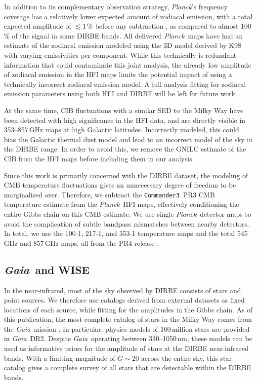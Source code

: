 \documentclass{aa}
\def\commanderthree{\texttt{Commander3}}
\def\Planck{\textit{Planck}}
\def\GAIA{\textit{Gaia}}
\def\Gaia{\textit{Gaia}}
\def\WISE{WISE}
\begin{document}
In addition to its complementary observation strategy, \Planck's frequency coverage has a relatively lower expected amount of zodiacal emission, with a total expected amplitude of $\lesssim1\,\%$ before any subtraction \citep{maris2006c,planck2013-pip88}, as compared to almost 100\,\% of the signal in some DIRBE bands. All delivered \Planck\ maps have had an estimate of the zodiacal emission modeled using the 3D model derived by K98 with varying emissivities per component. While this technically is redundant information that could contaminate this joint analysis, the already low amplitude of zodiacal emission in the HFI maps limits the potential impact of using a technically incorrect zodiacal emission model. A full analysis fitting for zodiacal emission parameters using both HFI and DIRBE will be left for future work.


At the same time, CIB fluctuations with a similar SED to the Milky Way have been detected with high significance in the HFI data, and are directly visible in 353--857\,GHz maps at high Galactic latitudes. Incorrectly modeled, this could bias the Galactic thermal dust model and lead to an incorrect model of the sky in the DIRBE range. In order to avoid this, we remove the GNILC \citep{planck2016-XLVIII} estimate of the CIB from the HFI maps before including them in our analysis.

Since this work is primarily concerned with the DIRBE dataset, the modeling of CMB temperature fluctuations gives an unnecessary degree of freedom to be marginalized over. Therefore, we subtract the \commanderthree\ PR3 CMB temperature estimate from the \Planck\ HFI maps, effectively conditioning the entire Gibbs chain on this CMB estimate.
We use single \Planck\ detector maps to avoid the complication of subtle bandpass mismatches between nearby detectors. In total, we use the 100-1, 217-1, and 353-1 temperature maps and the total 545\,GHz and 857\,GHz maps, all from the PR4 release \citep{npipe}.

\subsection{\GAIA\ and \WISE}

In the near-infrared, most of the sky observed by DIRBE consists of stars and point sources. We therefore use catalogs derived from external datasets as fixed locations of each source, while fitting for the amplitudes in the Gibbs chain. As of this publication, the most complete catalog of stars in the  Milky Way comes from the \Gaia\ mission \citep{gaia:2016,gaia:2018}. In particular, physics models of 100\,million stars are provided in \Gaia\ DR2. Despite \Gaia\ operating between 330--1050\,nm, these models can be used as informative priors for the amplitude of stars at the DIRBE near-infrared bands. With a limiting magnitude of $G\sim20$ across the entire sky, this star catalog gives a complete survey of all stars that are detectable within the DIRBE bands.
\end{document}
